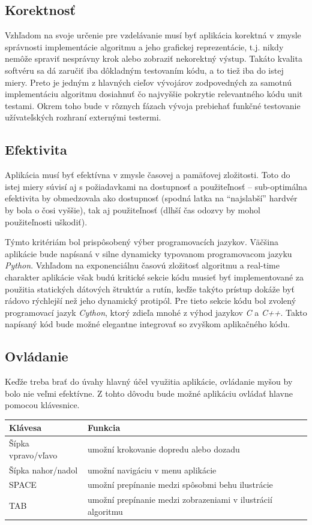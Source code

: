 \documentclass{article}
\begin{document}
\subsection{Korektnosť}\label{subsec:correctness}
Vzhľadom na svoje určenie pre vzdelávanie musí byť aplikácia korektná v zmysle správnosti implementácie algoritmu a jeho grafickej reprezentácie, t.j. nikdy nemôže spraviť nesprávny krok alebo zobraziť nekorektný výstup.
Takáto kvalita softvéru sa dá zaručiť iba dôkladným testovaním kódu, a to tiež iba do istej miery. Preto je jedným z hlavných cieľov vývojárov zodpovedných za samotnú implementáciu algoritmu dosiahnuť čo najvyššie pokrytie relevantného kódu unit testami. Okrem toho bude v rôznych fázach vývoja prebiehať funkčné testovanie užívateľských rozhraní externými testermi.

\subsection{Efektivita}\label{subsec:effectivity}
Aplikácia musí byť efektívna v zmysle časovej a pamäťovej zložitosti. Toto do istej miery súvisí aj s požiadavkami na dostupnosť a použiteľnosť – sub-optimálna efektivita by obmedzovala ako dostupnosť (spodná latka na “najslabší” hardvér by bola o čosi vyššie), tak aj použiteľnosť (dlhší čas odozvy by mohol použiteľnosti uškodiť).

Týmto kritériám bol prispôsobený výber programovacích jazykov. Väčšina aplikácie bude napísaná v silne dynamicky typovanom programovacom jazyku \emph{Python}. Vzhľadom na exponenciálnu časovú zložitosť algoritmu a real-time charakter aplikácie však budú kritické sekcie kódu musieť byť implementované za použitia statických dátových štruktúr a rutín, keďže takýto prístup dokáže byť rádovo rýchlejší než jeho dynamický protipól. Pre tieto sekcie kódu bol zvolený programovací jazyk \emph{Cython}, ktorý zdieľa mnohé z výhod jazykov \emph{C} a \emph{C++}. Takto napísaný kód bude možné elegantne integrovať so zvyškom aplikačného kódu.

\newpage

\subsection{Ovládanie}\label{subsec:handling}
Keďže treba brať do úvahy hlavný účel využitia aplikácie, ovládanie myšou by bolo nie veľmi efektívne. Z tohto dôvodu bude možné aplikáciu ovládať hlavne pomocou klávesnice.


\begin{tabular}{|l|p{32em}|}
	\hline
	\textbf{Klávesa} &
	\textbf{Funkcia} \\
	\hline
	Šípka vpravo/vľavo &
	umožní krokovanie dopredu alebo dozadu \\
	\hline
	Šípka nahor/nadol &
	umožní navigáciu v menu aplikácie \\
	\hline
	SPACE & umožní prepínanie medzi spôsobmi behu ilustrácie \\
	\hline
	TAB & umožní prepínanie medzi zobrazeniami v ilustrácií algoritmu	 \\
	\hline
\end{tabular}
\end{document}
